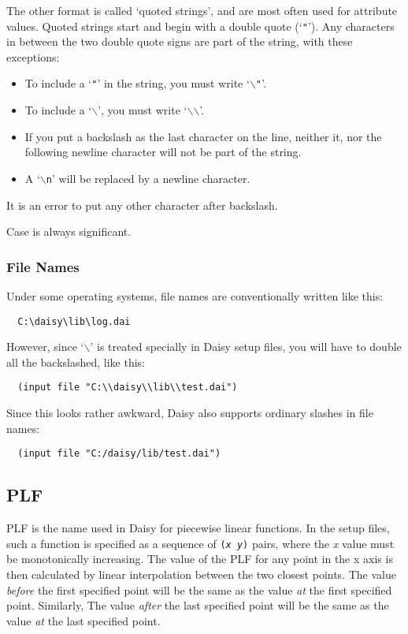 The other format is called `quoted strings', and are most often used
for attribute values.  Quoted strings start and begin with a double
quote (`\texttt{"}').  Any characters in between the two double quote
signs are part of the string, with these exceptions:
\begin{itemize}
\item To include a `\texttt{"}' in the string, you must write
  `\texttt{\mbox{$\backslash$}"}'.
\item To include a `\texttt{\mbox{$\backslash$}}', you must write
  `\texttt{\mbox{$\backslash$}\mbox{$\backslash$}}'.
\item If you put a backslash as the last character on the line,
  neither it, nor the following newline character will not be part of
  the string.
\item A `\texttt{\mbox{$\backslash$}n}' will be replaced by a newline
  character. 
\end{itemize}
It is an error to put any other character after backslash.  

Case is always significant.
\subsubsection{File Names}

Under some operating systems,  file names are conventionally written
like this:
\begin{verbatim}
  C:\daisy\lib\log.dai
\end{verbatim}

However, since `\texttt{\mbox{$\backslash$}}' is treated specially in
Daisy setup files, you will have to double all the backslashed, like
this:
\begin{verbatim}
  (input file "C:\\daisy\\lib\\test.dai")
\end{verbatim}

Since this looks rather awkward, Daisy also supports ordinary slashes
in file names:
\begin{verbatim}
  (input file "C:/daisy/lib/test.dai")
\end{verbatim}

\subsection{PLF}
\label{type:plf}

PLF is the name used in Daisy for piecewise linear functions.  In the
setup files, such a function is specified as a sequence of
\texttt{(\emph{x} \emph{y})} pairs, where the \emph{x} value must be
monotonically increasing.  The value of the PLF for any point in the x
axis is then calculated by linear interpolation between the two
closest points.  The value \emph{before} the first specified point
will be the same as the value \emph{at} the first specified point.
Similarly, The value \emph{after} the last specified point will be the
same as the value \emph{at} the last specified point.

